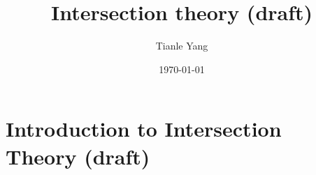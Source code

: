 \documentclass[sectionlevel=chapter]{noteformyself}
\title{Intersection theory (draft)}
\author{Tianle Yang}
\date{\today}
\begin{document}
    \maketitle

    \tableofcontents

    \section{Introduction to Intersection Theory (draft)}
    

    \printbibliography[heading=bibintoc, title={References}]
    
\end{document}
